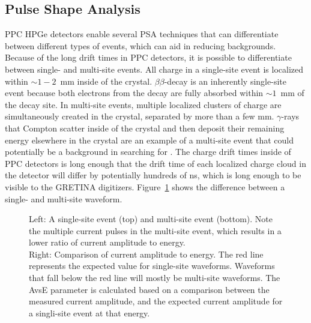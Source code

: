 \documentclass[/main.tex]{subfiles}
\begin{document}
\subsection{Pulse Shape Analysis}
PPC HPGe detectors enable several PSA techniques that can differentiate between different types of events, which can aid in reducing backgrounds.
Because of the long drift times in PPC detectors, it is possible to differentiate between single- and multi-site events.
All charge in a single-site event is localized within $\sim1-2$~mm inside of the crystal.
$\beta\beta$-decay is an inherently single-site event because both electrons from the decay are fully absorbed within $\sim1$~mm of the decay site.
In multi-site events, multiple localized clusters of charge are simultaneously created in the crystal, separated by more than a few mm.
$\gamma$-rays that Compton scatter inside of the crystal and then deposit their remaining energy elsewhere in the crystal are an example of a multi-site event that could potentially be a background in searching for \znbb.
The charge drift times inside of PPC detectors is long enough that the drift time of each localized charge cloud in the detector will differ by potentially hundreds of ns, which is long enough to be visible to the GRETINA digitizers.
Figure~\ref{fig:avse} shows the difference between a single- and multi-site waveform.
\\
\begin{figure}
  \centering
  \caption[Multi-site event cut]{\label{fig:avse}
    Left: A single-site event (top) and multi-site event (bottom). Note the multiple current pulses in the multi-site event, which results in a lower ratio of current amplitude to energy.\\
    Right: Comparison of current amplitude to energy. The red line represents the expected value for single-site waveforms. Waveforms that fall below the red line will mostly be multi-site waveforms. The AvsE parameter is calculated based on a comparison between the measured current amplitude, and the expected current amplitude for a singli-site event at that energy.
  }
\end{figure}
\end{document}
